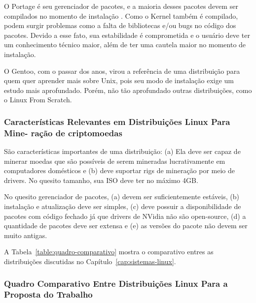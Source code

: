 \documentclass[
article,			%
12pt,				%
openright,			%
oneside,			%
a4paper,			%
chapter=TITLE,		%
section=TITLE,		%
subsection=TITLE,	%
subsubsection=TITLE,%
subsubsubsection=TITLE, %
english,			%
brazil,				%
]{abntex2}
\begin{document}
O Portage é seu gerenciador de pacotes, e a maioria desses pacotes
devem ser compilados no momento de instalação \cite{GentooWiki2018}.
Como o Kernel também é compilado, podem surgir problemas como a falta
de bibliotecas e/ou bugs no código dos pacotes. Devido a esse fato,
sua estabilidade é comprometida e o usuário deve ter um conhecimento
técnico maior, além de ter uma cautela maior no momento de instalação.

O Gentoo, com o passar dos anos, virou a referência de uma
distribuição para quem quer aprender mais sobre Unix, pois seu modo de
instalação exige um estudo mais aprofundado. Porém, não tão
aprofundado outras distribuições, como o Linux From Scratch.

\subsubsection{Características Relevantes em Distribuições Linux Para Mine-
ração de criptomoedas}

São características importantes de uma distribuição: (a) Ela deve ser
capaz de minerar moedas que são possíveis de serem mineradas
lucrativamente em computadores domésticos e (b) deve suportar rigs de
mineração por meio de drivers. No quesito tamanho, sua ISO deve ter no
máximo 4GB\@.

No quesito gerenciador de pacotes, (a) devem ser suficientemente
estáveis, (b) instalação e atualização deve ser simples, (c) deve
possuir a disponibilidade de pacotes com código fechado já que drivers
de NVidia não são open-source, (d) a quantidade de pacotes deve ser
extensa e (e) as versões do pacote não devem ser muito antigas.

A Tabela~\ref{table:quadro-comparativo} mostra o comparativo entres as
distribuições discutidas no Capítulo~\ref{cap:sistemas-linux}.

\subsubsection{Quadro Comparativo Entre Distribuições Linux Para a
Proposta do Trabalho}
\end{document}
